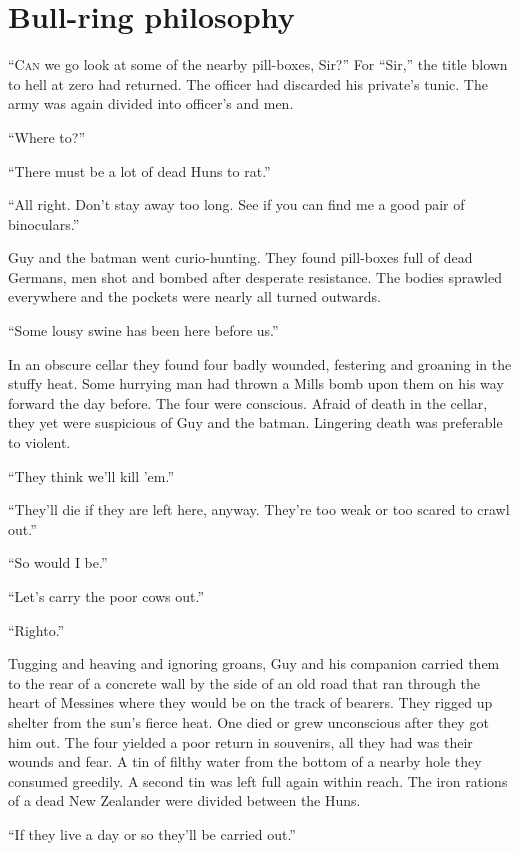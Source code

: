 \chapter*{\textsf{Bull-ring philosophy}}

``C\textsc{an} we go look at some of the nearby pill-boxes, Sir?'' For ``Sir,'' the title blown to hell at zero had returned. The officer had discarded his private's tunic. The army was again divided into officer's and men.

``Where to?''

``There must be a lot of dead Huns to rat.''

``All right. Don't stay away too long. See if you can find me a good pair of binoculars.''

Guy and the batman went curio-hunting. They found pill-boxes full of dead Germans, men shot and bombed after desperate resistance. The bodies sprawled everywhere and the pockets were nearly all turned outwards.

``Some lousy swine has been here before us.''

In an obscure cellar they found four badly wounded, festering and groaning in the stuffy heat. Some hurrying man had thrown a Mills bomb upon them on his way forward the day before. The four were conscious. Afraid of death in the cellar, they yet were suspicious of Guy and the batman. Lingering death was preferable to violent.

``They think we'll kill 'em.''

``They'll die if they are left here, anyway. They're too weak or too scared to crawl out.''

``So would I be.''

``Let's carry the poor cows out.''

``Righto.''

Tugging and heaving and ignoring groans, Guy and his companion carried them to the rear of a concrete wall by the side of an old road that ran through the heart of Messines where they would be on the track of bearers. They rigged up shelter from the sun's fierce heat. One died or grew unconscious after they got him out. The four yielded a poor return in souvenirs, all they had was their wounds and fear. A tin of filthy water from the bottom of a nearby hole they consumed greedily. A second tin was left full again within reach. The iron rations of a dead New Zealander were divided between the Huns.

``If they live a day or so they'll be carried out.''


